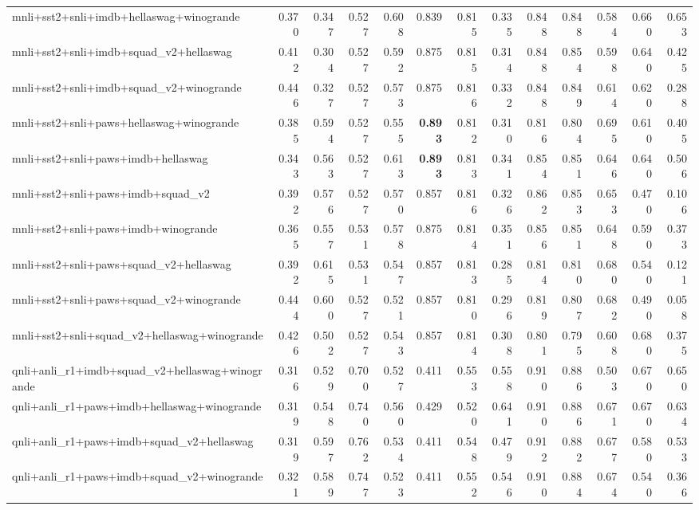 \begin{table}[t]
\begin{tabular}{lrrrrrrrrrrrr}
    mnli+sst2+snli+imdb+hellaswag+winogrande & 0.370 & 0.347 & 0.527 & 0.608 & 0.839 & 0.815 & 0.335 & 0.848 & 0.848 & 0.584 & 0.660 & 0.653 \\
    mnli+sst2+snli+imdb+squad\_v2+hellaswag & 0.412 & 0.304 & 0.527 & 0.592 & 0.875 & 0.815 & 0.314 & 0.848 & 0.854 & 0.598 & 0.640 & 0.425 \\
    mnli+sst2+snli+imdb+squad\_v2+winogrande & 0.446 & 0.327 & 0.527 & 0.573 & 0.875 & 0.816 & 0.332 & 0.848 & 0.849 & 0.614 & 0.620 & 0.288 \\
    mnli+sst2+snli+paws+hellaswag+winogrande & 0.385 & 0.594 & 0.527 & 0.555 & \textbf{0.893} & 0.812 & 0.310 & 0.816 & 0.804 & 0.695 & 0.610 & 0.405 \\
    mnli+sst2+snli+paws+imdb+hellaswag & 0.343 & 0.563 & 0.527 & 0.613 & \textbf{0.893} & 0.813 & 0.341 & 0.854 & 0.851 & 0.646 & 0.640 & 0.506 \\
    mnli+sst2+snli+paws+imdb+squad\_v2 & 0.392 & 0.576 & 0.527 & 0.570 & 0.857 & 0.816 & 0.326 & 0.862 & 0.853 & 0.653 & 0.470 & 0.106 \\
    mnli+sst2+snli+paws+imdb+winogrande & 0.365 & 0.557 & 0.531 & 0.578 & 0.875 & 0.814 & 0.351 & 0.856 & 0.851 & 0.648 & 0.590 & 0.373 \\
    mnli+sst2+snli+paws+squad\_v2+hellaswag & 0.392 & 0.615 & 0.531 & 0.547 & 0.857 & 0.813 & 0.285 & 0.814 & 0.810 & 0.680 & 0.540 & 0.121 \\
    mnli+sst2+snli+paws+squad\_v2+winogrande & 0.444 & 0.600 & 0.527 & 0.521 & 0.857 & 0.810 & 0.296 & 0.819 & 0.807 & 0.682 & 0.490 & 0.058 \\
    mnli+sst2+snli+squad\_v2+hellaswag+winogrande & 0.426 & 0.502 & 0.527 & 0.543 & 0.857 & 0.814 & 0.308 & 0.801 & 0.795 & 0.608 & 0.680 & 0.375 \\
    qnli+anli\_r1+imdb+squad\_v2+hellaswag+winogrande & 0.316 & 0.529 & 0.700 & 0.527 & 0.411 & 0.553 & 0.558 & 0.910 & 0.886 & 0.503 & 0.670 & 0.650 \\
    qnli+anli\_r1+paws+imdb+hellaswag+winogrande & 0.319 & 0.548 & 0.740 & 0.560 & 0.429 & 0.520 & 0.641 & 0.910 & 0.886 & 0.671 & 0.670 & 0.634 \\
    qnli+anli\_r1+paws+imdb+squad\_v2+hellaswag & 0.319 & 0.597 & 0.762 & 0.534 & 0.411 & 0.548 & 0.479 & 0.912 & 0.882 & 0.677 & 0.580 & 0.533 \\
    qnli+anli\_r1+paws+imdb+squad\_v2+winogrande & 0.321 & 0.589 & 0.747 & 0.523 & 0.411 & 0.552 & 0.546 & 0.910 & 0.884 & 0.674 & 0.540 & 0.366 \\

\end{tabular}
\end{table}
